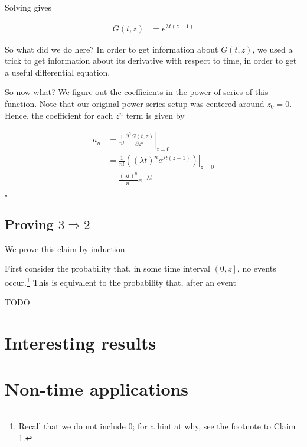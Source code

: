 \documentclass{article}
\begin{document}
Solving gives 

\begin{align*}
G(t,z) &= e^{\lambda t (z-1)}
\end{align*}



So what did we do here? In order to get information about $G(t,z)$, we used a trick to get information about its derivative with respect to time, in order to get a useful differential equation. 

So now what? We figure out the coefficients in the power of series of this function. Note that our original power series setup was centered around $z_0 = 0$. Hence, the coefficient for each $z^n$ term is given by

\begin{align*}
a_n &= \left.\frac{1}{n!} \frac{\partial^n G(t, z)}{\partial z^n}\right\vert_{z=0} \\
&= \left.\frac{1}{n!} \left((\lambda t)^n e^{\lambda t (z-1)}\right) \right\vert_{z=0} \\
&= \frac{(\lambda t)^n}{n!}e^{-\lambda t}
\end{align*}

$\square$


\subsection{Proving $3 \Rightarrow 2$}

We prove this claim by induction. 

First consider the probability that, in some time interval $\left(0, z\right]$, no events occur.\footnote{Recall that we do not include 0; for a hint at why, see the footnote to Claim 1.} This is equivalent to the probability that, after an event 

TODO





\section{Interesting results}


\section{Non-time applications}
\end{document}
